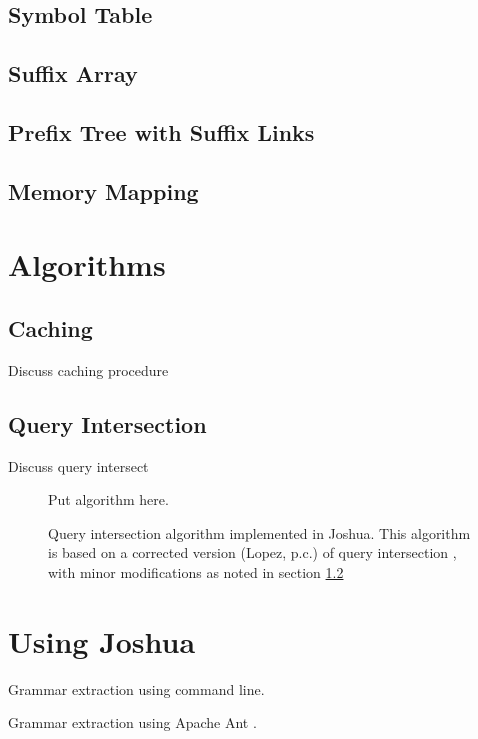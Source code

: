 \documentclass{pbml}
\begin{document}
\subsection{Symbol Table}

\subsection{Suffix Array}

\subsection{Prefix Tree with Suffix Links}

\subsection{Memory Mapping}


\section{Algorithms}


\subsection{Caching}
Discuss caching procedure

\subsection{Query Intersection}
\label{query-intersection}
Discuss query intersect

\begin{figure}

Put algorithm here.

\caption{Query intersection algorithm implemented in Joshua. This algorithm is based on a corrected version (Lopez, p.c.) of query intersection {\protect \cite{Lopez2008}}, with minor modifications as noted in section \ref{query-intersection}}
\end{figure}


\section{Using Joshua}

Grammar extraction using command line.

Grammar extraction using Apache Ant \cite{ant1.7.1}.
\end{document}
